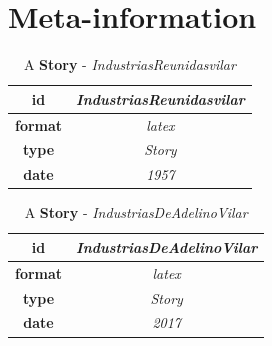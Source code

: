 \documentclass{article}
\begin{document}
	\section{Meta-information}

	
		\begin{table}[ht!]
			\centering
			\begin{tabular}{|c|c|}
				\hline
				
					\textbf{ id } & \textit{ IndustriasReunidasvilar } \\
					\hline
				
					\textbf{ format } & \textit{ latex } \\
					\hline
				
					\textbf{ type } & \textit{ Story } \\
					\hline
				
					\textbf{ date } & \textit{ 1957 } \\
					\hline
				
			\end{tabular}
			\caption{A \textbf{ Story }-\textit{ IndustriasReunidasvilar }} %
			\label{table:\arabic{tablecounter2}} %
		\end{table}
	
		\begin{table}[ht!]
			\centering
			\begin{tabular}{|c|c|}
				\hline
				
					\textbf{ id } & \textit{ IndustriasDeAdelinoVilar } \\
					\hline
				
					\textbf{ format } & \textit{ latex } \\
					\hline
				
					\textbf{ type } & \textit{ Story } \\
					\hline
				
					\textbf{ date } & \textit{ 2017 } \\
					\hline
				
			\end{tabular}
			\caption{A \textbf{ Story }-\textit{ IndustriasDeAdelinoVilar }} %
			\label{table:\arabic{tablecounter2}} %
		\end{table}
	
\end{document}
